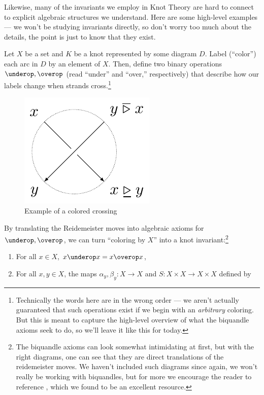 Likewise, many of the invariants we employ in Knot Theory are hard to
connect to explicit algebraic structures we understand. Here are some
high-level examples --- we won't be studying invariants directly, so
don't worry too much about the details, the point is just to know that
they exist.
\begin{example}[Biquandles]
  Let $X$ be a set and $K$ be a knot represented by some diagram $D$.
  Label (``color'') each arc in $D$ by an element of $X$. Then, define
  two binary operations $\underop, \overop$ (read ``under'' and
  ``over,'' respectively) that describe how our labels change when
  strands cross.\footnote{Technically the words here are in the wrong
    order --- we aren't actually guaranteed that such operations exist
    if we begin with an \emph{arbitrary} coloring. But this is meant
    to capture the high-level overview of what the biquandle axioms
    seek to do, so we'll leave it like this for today.}
  \begin{figure}[H]
    \centering
    \includegraphics[scale=.7]{figures/fundamentals/biquandles.pdf}
    \caption{Example of a colored crossing}
  \end{figure}
  By translating the Reidemeister moves into algebraic axioms for
  $\underop, \overop$, we can turn ``coloring by $X$'' into a knot
  invariant:\footnote{The biquandle axioms can look somewhat
    intimidating at first, but with the right diagrams, one can see
    that they are direct translations of the reidemeister moves. We
    haven't included such diagrams since again, we won't really be
    working with biquandles, but for more we encourage the reader to
    reference \cite{NelsonBook}, which we found to be an excellent
    resource.}
  \begin{enumerate}
    \item For all $x \in X$, $x \underop x = x \overop x$,
    \item For all $x,y \in X$, the maps $\alpha_y, \beta_y : X \to X$
      and $S : X \times X \to X \times X$ defined by

\end{enumerate}
\end{example}

